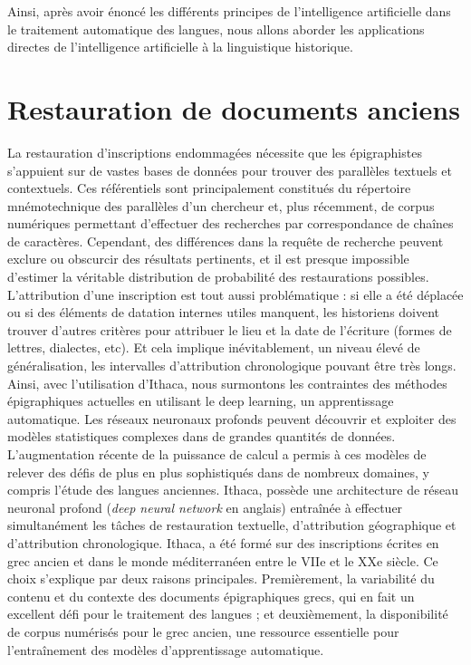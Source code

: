 \documentclass[12pt, french, twoside]{report}
\begin{document}
\indent Ainsi, après avoir énoncé les différents principes de l'intelligence artificielle dans le traitement automatique des langues, nous allons aborder les applications directes de l'intelligence artificielle à la linguistique historique.

\section{Restauration de documents anciens}
\indent La restauration d'inscriptions endommagées nécessite que les épigraphistes s'appuient sur de vastes bases de données pour trouver des parallèles textuels et contextuels. Ces référentiels sont principalement constitués du répertoire mnémotechnique des parallèles d'un chercheur et, plus récemment, de corpus numériques permettant d'effectuer des recherches par \og correspondance de chaînes de caractères\fg. Cependant, des différences dans la requête de recherche peuvent exclure ou obscurcir des résultats pertinents, et il est presque impossible d'estimer la véritable distribution de probabilité des restaurations possibles. L'attribution d'une inscription est tout aussi problématique : si elle a été déplacée ou si des éléments de datation internes utiles manquent, les historiens doivent trouver d'autres critères pour attribuer le lieu et la date de l'écriture (formes de lettres, dialectes, etc). Et cela implique inévitablement, un niveau élevé de généralisation, les intervalles d'attribution chronologique pouvant être très longs.\\

Ainsi, avec l'utilisation d'Ithaca, nous surmontons les contraintes des méthodes épigraphiques actuelles en utilisant le deep learning, un apprentissage automatique. Les réseaux neuronaux profonds peuvent découvrir et exploiter des modèles statistiques complexes dans de grandes quantités de données. L'augmentation récente de la puissance de calcul a permis à ces modèles de relever des défis de plus en plus sophistiqués dans de nombreux domaines, y compris l'étude des langues anciennes.
Ithaca, possède une architecture de réseau neuronal profond (\textit{deep neural network} en anglais) entraînée à effectuer simultanément les tâches de restauration textuelle, d'attribution géographique et d'attribution chronologique. Ithaca, a été formé sur des inscriptions écrites en grec ancien et dans le monde méditerranéen entre le VIIe et le XXe siècle. Ce choix s'explique par deux raisons principales. Premièrement, la variabilité du contenu et du contexte des documents épigraphiques grecs, qui en fait un excellent défi pour le traitement des langues ; et deuxièmement, la disponibilité de corpus numérisés pour le grec ancien, une ressource essentielle pour l'entraînement des modèles d'apprentissage automatique.\\
\end{document}
